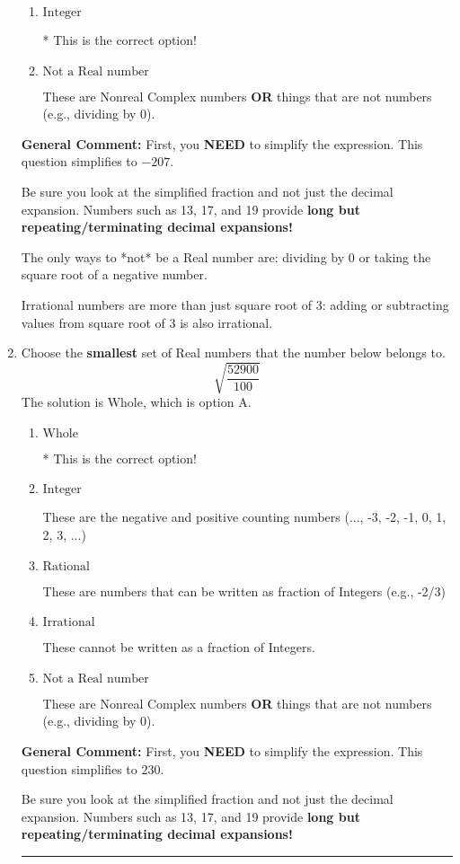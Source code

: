 \documentclass{extbook}[14pt]
\newcommand{\litem}[1]{\item #1

\rule{\textwidth}{0.4pt}}
\begin{document}
\begin{enumerate}
{\begin{enumerate}[label=\Alph*.]
These cannot be written as a fraction of Integers.
\item \( \text{Integer} \)

* This is the correct option!
\item \( \text{Not a Real number} \)

These are Nonreal Complex numbers \textbf{OR} things that are not numbers (e.g., dividing by 0).
\end{enumerate}

\textbf{General Comment:} First, you \textbf{NEED} to simplify the expression. This question simplifies to $-207$. 
 
 Be sure you look at the simplified fraction and not just the decimal expansion. Numbers such as 13, 17, and 19 provide \textbf{long but repeating/terminating decimal expansions!} 
 
 The only ways to *not* be a Real number are: dividing by 0 or taking the square root of a negative number. 
 
 Irrational numbers are more than just square root of 3: adding or subtracting values from square root of 3 is also irrational.
}
\litem{
Choose the \textbf{smallest} set of Real numbers that the number below belongs to.
\[ \sqrt{\frac{52900}{100}} \]The solution is \( \text{Whole} \), which is option A.\begin{enumerate}[label=\Alph*.]
\item \( \text{Whole} \)

* This is the correct option!
\item \( \text{Integer} \)

These are the negative and positive counting numbers (..., -3, -2, -1, 0, 1, 2, 3, ...)
\item \( \text{Rational} \)

These are numbers that can be written as fraction of Integers (e.g., -2/3)
\item \( \text{Irrational} \)

These cannot be written as a fraction of Integers.
\item \( \text{Not a Real number} \)

These are Nonreal Complex numbers \textbf{OR} things that are not numbers (e.g., dividing by 0).
\end{enumerate}

\textbf{General Comment:} First, you \textbf{NEED} to simplify the expression. This question simplifies to $230$. 
 
 Be sure you look at the simplified fraction and not just the decimal expansion. Numbers such as 13, 17, and 19 provide \textbf{long but repeating/terminating decimal expansions!} 
 
}
\end{enumerate}
\end{document}
